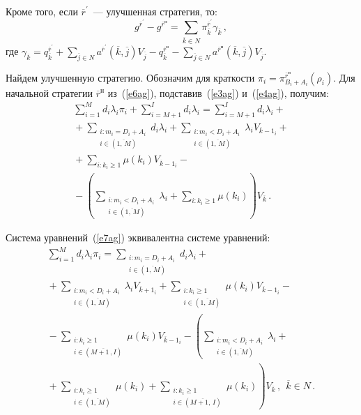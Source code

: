 \begin{multicols}{2}
  Кроме того, если $\overline{r}^\prime$~--- улучшенная стратегия, то:
  $$
  g^{\overline{r}^\prime} - g^{\overline{r}^{\mathrm{н}}} = \sum\limits_{\overline{k}\in
N}\pi_{\overline{k}}^{\overline{r}^\prime} \gamma_{\overline{k}}\,,
  $$
  где $\gamma_{\overline{k}} = q_{\overline{k}}^{\overline{r}^\prime}+
\sum\limits_{\overline{j}\in N} a^{\overline{r}^\prime}
(\overline{k},\overline{j})V_{\overline{j}}-q_{\overline{k}}^{\overline{r}^{\mathrm{н}}} - 
\sum\limits_{\overline{j}\in N}  a^{\overline{r}^{\mathrm{н}}} (\overline{k}, \overline{j})V_{\overline{j}}$.

  Найдем улучшенную стратегию. Обозначим для краткости $\pi_i =
\pi_{B_i+A_i}^{\overline{r}^{\mathrm{н}}}(\rho_i)$. Для начальной стратегии
$\overline{r}^{\mathrm{н}}$ из~(\ref{e6ag}), подставив~(\ref{e3ag})
и~(\ref{e4ag}), получим:
  \begin{multline}
  \sum\limits_{i=1}^M d_i\lambda_i\pi_i +\sum\limits_{i=M+1}^I d_i\lambda_i =
  \sum\limits_{i=M+1}^I d_i\lambda_i +{}
  \\ {}+
  \sum\limits_{\substack{{i:m_i=D_i+A_i}\\{i\in(\overline{1,\,M})}}}d_i\lambda_i 
  + \sum\limits_{\substack{{i:m_i<D_i+A_i}\\
  { i\in(\overline{1,\,M})}}}\lambda_iV_{\overline{k}-1_i}+{}\\
  {}+
  \sum\limits_{i:k_i\geq 1}\mu(k_i)V_{\overline{k}-1_i} -{}\\
  {}-
  \left ( \sum\limits_{\substack{{i:m_i<D_i+A_i}\\{i\in(\overline{1,\,M})}}}
  \lambda_i +\sum\limits_{{i:} k_i\geq 1} \mu(k_i)\right )
V_{\overline{k}}\,.
  \label{e7ag}
  \end{multline}

  Система уравнений~(\ref{e7ag}) эквивалентна системе уравнений:
  \begin{multline}
  \sum\limits_{i=1}^M d_i\lambda_i\pi_i =
  \sum\limits_{\substack{{i:m_i =D_i+A_i}\\
  {i\in (\overline{1,\,M})}}} d_i\lambda_i+{}\\
  {}+
  \sum\limits_{\substack{{i:m_i <D_i+A_i}\\
  { i\in (\overline{1,\,M})}}}
  \lambda_iV_{\overline{k}+1_i}
  +
  \sum\limits_{\substack{{i:k_i\geq 1}\\{i\in (\overline{1,\,M})}}}\mu (k_i)V_{\overline{k}-1_i}-{}\\
  {}-
  \sum\limits_{\substack{{i:k_i\geq1}\\{i\in (\overline{M+1\,,I})}}}
  \mu(k_i)V_{\overline{k}-1_i}
  -
  \left ( \sum\limits_{\substack{{ i:m_i<D_i+A_i}\\
  {i\in (\overline{1,\,M}) }}} \lambda_i +{}\right.{}\\
  {}+\left.
  \sum\limits_{\substack{{i:k_i\geq 1}\\{i\in (\overline{1,\,M})}}} \mu(k_i)+
  \sum\limits_{\substack{{i:k_i\geq 1}\\{i\in (\overline{M+1,\,I})}}} \mu(k_i)\right )
V_{\overline{k}}\,, \ \
 \overline{k}\in N\,.
  \label{e8ag}
  \end{multline}


\end{multicols}
